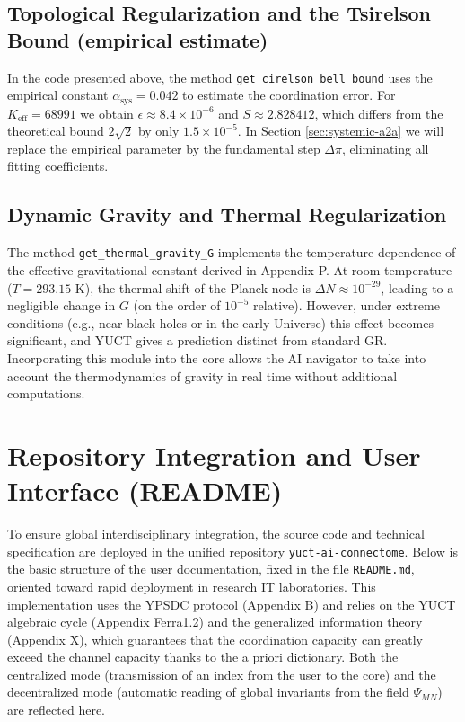 \documentclass[12pt,a4paper]{article}
\begin{document}
	\subsection{Topological Regularization and the Tsirelson Bound (empirical estimate)}
	\label{sec:bell-regularization}
	
	In the code presented above, the method \texttt{get\_cirelson\_bell\_bound} uses the empirical constant \(\alpha_{\text{sys}} = 0.042\) to estimate the coordination error. For \(K_{\mathrm{eff}} = 68991\) we obtain \(\epsilon \approx 8.4 \times 10^{-6}\) and \(S \approx 2.828412\), which differs from the theoretical bound \(2\sqrt{2}\) by only \(1.5 \times 10^{-5}\). In Section \ref{sec:systemic-a2a} we will replace the empirical parameter by the fundamental step \(\Delta\pi\), eliminating all fitting coefficients.
	
	\subsection{Dynamic Gravity and Thermal Regularization}
	\label{subsec:thermal-gravity}
	
	The method \texttt{get\_thermal\_gravity\_G} implements the temperature dependence of the effective gravitational constant derived in Appendix P. At room temperature (\(T = 293.15\) K), the thermal shift of the Planck node is \(\Delta N \approx 10^{-29}\), leading to a negligible change in \(G\) (on the order of \(10^{-5}\) relative). However, under extreme conditions (e.g., near black holes or in the early Universe) this effect becomes significant, and YUCT gives a prediction distinct from standard GR. Incorporating this module into the core allows the AI navigator to take into account the thermodynamics of gravity in real time without additional computations.
	
	\section{Repository Integration and User Interface (README)}
	To ensure global interdisciplinary integration, the source code and technical specification are deployed in the unified repository \texttt{yuct-ai-connectome}. Below is the basic structure of the user documentation, fixed in the file \texttt{README.md}, oriented toward rapid deployment in research IT laboratories. This implementation uses the YPSDC protocol (Appendix B) and relies on the YUCT algebraic cycle (Appendix Ferra1.2) and the generalized information theory (Appendix X), which guarantees that the coordination capacity can greatly exceed the channel capacity thanks to the a priori dictionary. Both the centralized mode (transmission of an index from the user to the core) and the decentralized mode (automatic reading of global invariants from the field \(\Psi_{MN}\)) are reflected here.
	
\end{document}
